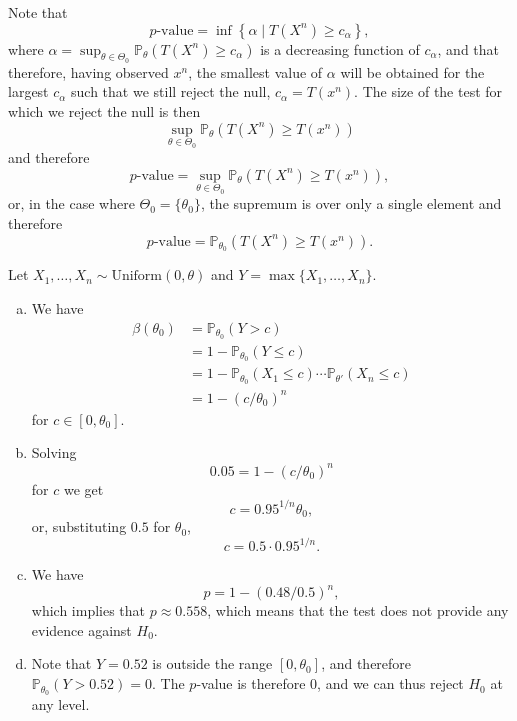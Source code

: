 \begin{ex}
  Note that
  \[
    p\text{-value}
    =\inf\left\{\alpha \mid T(X^n)\geq c_\alpha\right\},
  \]
  where $\alpha=\sup_{\theta\in\Theta_0}\mathbb{P}_{\theta}(T(X^n)\geq
    c_\alpha)$ is a decreasing function of $c_\alpha$, and that therefore,
  having observed $x^n$, the smallest value of $\alpha$ will be obtained for
  the largest $c_\alpha$ such that we still reject the null, $c_\alpha=T(x^n)$.
  The size of the test for which we reject the null is then
  \[
    \sup_{\theta\in\Theta_0}\mathbb{P}_{\theta}(T(X^n)\geq T(x^n))
  \]
  and therefore
  \[
    p\text{-value}
    =\sup_{\theta\in\Theta_0}\mathbb{P}_{\theta}(T(X^n)\geq T(x^n)),
  \]
  or, in the case where $\Theta_0=\{\theta_0\}$, the supremum is over only a
  single element and therefore
  \[
    p\text{-value}
    =\mathbb{P}_{\theta_0}(T(X^n)\geq T(x^n)).
  \]
\end{ex}

\begin{ex}
  Let $X_1,\ldots,X_n\sim\text{Uniform}(0,\theta)$ and
  $Y=\max\{X_1,\ldots,X_n\}$.
  \begin{enumerate}[(a)]
    \item We have
          \begin{align*}
            \beta(\theta_0)
             & =\mathbb{P}_{\theta_0}(Y>c)                                              \\
             & =1-\mathbb{P}_{\theta_0}(Y\leq c)                                        \\
             & =1-\mathbb{P}_{\theta_0}(X_1\leq c)\cdots\mathbb{P}_{\theta'}(X_n\leq c) \\
             & =1-(c/\theta_0)^n
          \end{align*}
          for $c\in[0,\theta_0]$.
    \item Solving
          \[
            0.05=1-(c/\theta_0)^n
          \]
          for $c$ we get
          \[
            c=0.95^{1/n}\theta_0,
          \]
          or, substituting $0.5$ for $\theta_0$,
          \[
            c=0.5\cdot 0.95^{1/n}.
          \]
    \item We have
          \[
            p=1-(0.48/0.5)^{n},
          \]
          which implies that $p\approx 0.558$, which means that the test does
          not provide any evidence against $H_0$.
    \item Note that $Y=0.52$ is outside the range $[0,\theta_0]$, and therefore
          $\mathbb{P}_{\theta_0}(Y>0.52)=0$. The $p$-value is therefore $0$, and
          we can thus reject $H_0$ at any level.
  \end{enumerate}
\end{ex}

